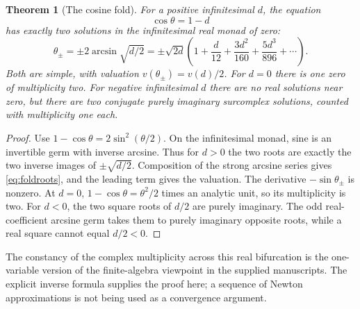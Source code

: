 \documentclass[11pt,letterpaper]{article}
\newtheorem{theorem}{Theorem}[section]
\theoremstyle{definition}
\theoremstyle{remark}
\newcommand{\arcs}{\operatorname{arcsin}}
\numberwithin{equation}{section}
\begin{document}
\begin{theorem}[The cosine fold]\label{thm:fold}
For a positive infinitesimal $d$, the equation
\[
 \cos\theta=1-d
\]
has exactly two solutions in the infinitesimal real monad of zero:
\begin{equation}\label{eq:foldroots}
 \theta_\pm=\pm2\arcs\sqrt{d/2}
 =\pm\sqrt{2d}\left(1+\frac d{12}
       +\frac{3d^2}{160}+\frac{5d^3}{896}+\cdots\right).
\end{equation}
Both are simple, with valuation $v(\theta_\pm)=v(d)/2$. For $d=0$ there is one zero of multiplicity two. For negative infinitesimal $d$ there are no real solutions near zero, but there are two conjugate purely imaginary surcomplex solutions, counted with multiplicity one each.
\end{theorem}
\begin{proof}
Use $1-\cos\theta=2\sin^2(\theta/2)$. On the infinitesimal monad, sine is an invertible germ with inverse arcsine. Thus for $d>0$ the two roots are exactly the two inverse images of $\pm\sqrt{d/2}$. Composition of the strong arcsine series gives \eqref{eq:foldroots}, and the leading term gives the valuation. The derivative $-\sin\theta_\pm$ is nonzero. At $d=0$, $1-\cos\theta=\theta^2/2$ times an analytic unit, so its multiplicity is two. For $d<0$, the two square roots of $d/2$ are purely imaginary. The odd real-coefficient arcsine germ takes them to purely imaginary opposite roots, while a real square cannot equal $d/2<0$.
\end{proof}
The constancy of the complex multiplicity across this real bifurcation is the one-variable version of the finite-algebra viewpoint in the supplied manuscripts. The explicit inverse formula supplies the proof here; a sequence of Newton approximations is not being used as a convergence argument.
\end{document}
